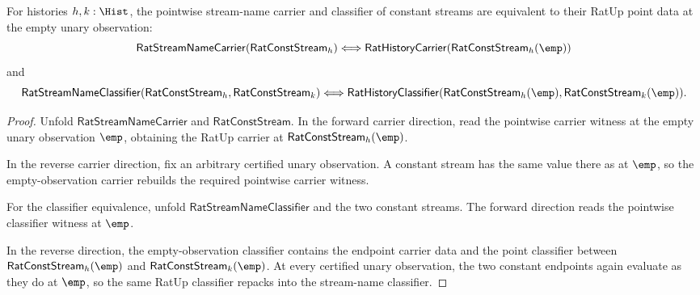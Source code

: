 \begin{theorem}
\label{thm:rat-const-stream-empty-point-exactness}
For histories $h,k:\Hist$, the pointwise stream-name carrier and classifier of
constant streams are equivalent to their RatUp point data at the empty unary
observation:
$$
\mathsf{RatStreamNameCarrier}(\mathsf{RatConstStream}_h)
\Longleftrightarrow
\mathsf{RatHistoryCarrier}(\mathsf{RatConstStream}_h(\emp))
$$
and
$$
\mathsf{RatStreamNameClassifier}(\mathsf{RatConstStream}_h,
\mathsf{RatConstStream}_k)
\Longleftrightarrow
\mathsf{RatHistoryClassifier}(\mathsf{RatConstStream}_h(\emp),
\mathsf{RatConstStream}_k(\emp)).
$$
\end{theorem}
\begin{proof}
Unfold $\mathsf{RatStreamNameCarrier}$ and $\mathsf{RatConstStream}$. In the
forward carrier direction, read the pointwise carrier witness at the empty
unary observation $\emp$, obtaining the RatUp carrier at
$\mathsf{RatConstStream}_h(\emp)$.

In the reverse carrier direction, fix an arbitrary certified unary
observation. A constant stream has the same value there as at $\emp$, so the
empty-observation carrier rebuilds the required pointwise carrier witness.

For the classifier equivalence, unfold $\mathsf{RatStreamNameClassifier}$ and
the two constant streams. The forward direction reads the pointwise classifier
witness at $\emp$.

In the reverse direction, the empty-observation classifier contains the endpoint
carrier data and the point classifier between
$\mathsf{RatConstStream}_h(\emp)$ and $\mathsf{RatConstStream}_k(\emp)$. At
every certified unary observation, the two constant endpoints again evaluate as
they do at $\emp$, so the same RatUp classifier repacks into the stream-name
classifier.
\end{proof}

